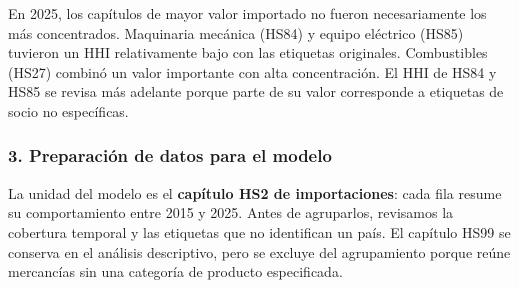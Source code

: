 \documentclass[
]{article}
\begin{document}
En 2025, los capítulos de mayor valor importado no fueron necesariamente
los más concentrados. Maquinaria mecánica (HS84) y equipo eléctrico
(HS85) tuvieron un HHI relativamente bajo con las etiquetas originales.
Combustibles (HS27) combinó un valor importante con alta concentración.
El HHI de HS84 y HS85 se revisa más adelante porque parte de su valor
corresponde a etiquetas de socio no específicas.

\subsubsection{3. Preparación de datos para el
modelo}\label{preparaciuxf3n-de-datos-para-el-modelo}

La unidad del modelo es el \textbf{capítulo HS2 de importaciones}: cada
fila resume su comportamiento entre 2015 y 2025. Antes de agruparlos,
revisamos la cobertura temporal y las etiquetas que no identifican un
país. El capítulo HS99 se conserva en el análisis descriptivo, pero se
excluye del agrupamiento porque reúne mercancías sin una categoría de
producto especificada.
\end{document}
